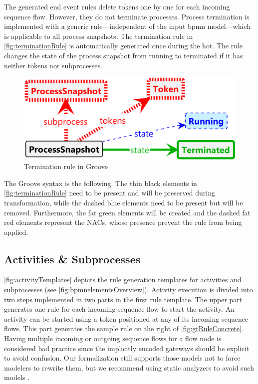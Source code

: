 \documentclass{lmcs} %
\theoremstyle{plain}\newtheorem{satz}[thm]{Satz} %
\begin{document}
The generated end event rules delete tokens one by one for each incoming sequence flow.
However, they do not terminate processes.
Process termination is implemented with a generic rule---independent of the input \gls*{bpmn} model---which is applicable to all process snapshots.
The termination rule in \autoref{fig:terminationRule} is automatically generated once during the \gls*{hot}.
The rule changes the state of the process snapshot from running to terminated if it has neither tokens nor subprocesses.

\begin{figure}[ht]
    \centering
    \includegraphics[width=.6\textwidth]{images/terminate_groove.png}
    \caption{Termination rule in Groove}
    \label{fig:terminationRule}
\end{figure}

The Groove syntax is the following.
The thin black elements in \autoref{fig:terminationRule} need to be present and will be preserved during transformation, while the dashed blue elements need to be present but will be removed.
Furthermore, the fat green elements will be created and the dashed fat red elements represent the NACs, whose presence prevent the rule from being applied.

\subsection{Activities \& Subprocesses}

\autoref{fig:activityTemplates} depicts the rule generation templates for activities and subprocesses (see \autoref{fig:bpmnelementsOverview}).
Activity execution is divided into two steps implemented in two parts in the first rule template.
The upper part generates one rule for each incoming sequence flow to start the activity.
An activity can be started using a token positioned at any of its incoming sequence flows.
This part generates the sample rule on the right of \autoref{fig:gtRuleConcrete}.
Having multiple incoming or outgoing sequence flows for a flow node is considered bad practice since the implicitly encoded gateways should be explicit to avoid confusion.
Our formalization still supports those models not to force modelers to rewrite them, but we recommend using static analyzers to avoid such models \cite{camundaservicesgmbhBpmnlint2023}.
\end{document}
